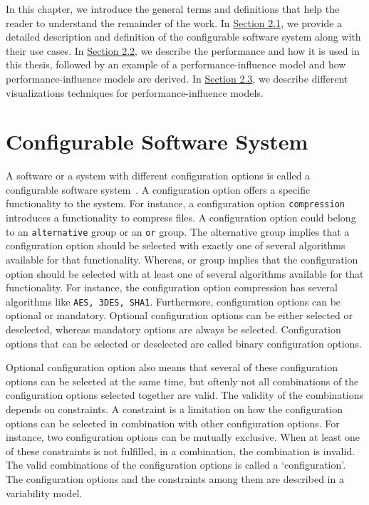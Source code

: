 \label{background}


In this chapter, we introduce the general terms and definitions that help the reader to understand the remainder of the work. In \hyperref[sec:2.1]{Section 2.1}, we provide a detailed description and definition of the configurable software system along with their use cases. In \hyperref[sec:2.2]{Section 2.2}, we describe the performance and how it is used in this thesis, followed by an example of a performance-influence model and how performance-influence models are derived. In \hyperref[sec:2.3]{Section 2.3}, we describe different visualizations techniques for performance-influence models.


\section{Configurable Software System}
\label{sec:2.1}
A software or a system with different configuration options is called a configurable software system~\cite{DBLP:books/daglib/0032924}. A configuration option offers a specific functionality to the system. For instance, a configuration option \texttt{compression} introduces a functionality to compress files. A configuration option could belong to an \texttt{alternative} group or an \texttt{or} group. The alternative group implies that a configuration option should be selected with exactly one of several algorithms available for that functionality. Whereas, or group implies that the configuration option should be selected with at least one of several algorithms available for that functionality. For instance, the configuration option compression has several algorithms like \texttt{AES, 3DES, SHA1}. Furthermore, configuration options can be optional or mandatory. Optional configuration options can be either selected or deselected, whereas mandatory options are always be selected. Configuration options that can be selected or deselected are called binary configuration options. 

Optional configuration option also means that several of these configuration options can be selected at the same time, but oftenly not all combinations of the configuration options selected together are valid. The validity of the combinations depends on constraints. A constraint is a limitation on how the configuration options can be selected in combination with other configuration options. For instance, two configuration options can be mutually exclusive. When at least one of these constraints is not fulfilled, in a combination, the combination is invalid. The valid combinations of the configuration options is called a \enquote*{configuration}. The configuration options and the constraints among them are described in a variability model. 

